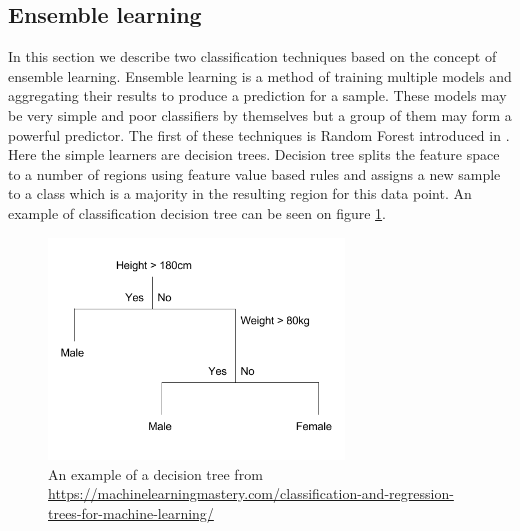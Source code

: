 \documentclass[shortabstract, english, mgr]{iithesis}
\begin{document}
\subsection{Ensemble learning}

In this section we describe two classification techniques based on the concept of ensemble learning. Ensemble learning is a method of training multiple models and aggregating their results to produce a prediction for a sample. These models may be very simple and poor classifiers by themselves but a group of them may form a powerful predictor. The first of these techniques is Random Forest introduced in \cite{RF}. Here the simple learners are decision trees. Decision tree splits the feature space to a number of regions using feature value based rules and assigns a new sample to a class which is a majority in the resulting region for this data point. An example of classification decision tree can be seen on figure \ref{fig:decision-tree}.

\begin{figure}
\centering
\includegraphics[width=0.7\textwidth]{images/decision_tree.png}
\caption{An example of a decision tree from \url{https://machinelearningmastery.com/classification-and-regression-trees-for-machine-learning/}}
\label{fig:decision-tree}
\end{figure}
\end{document}
